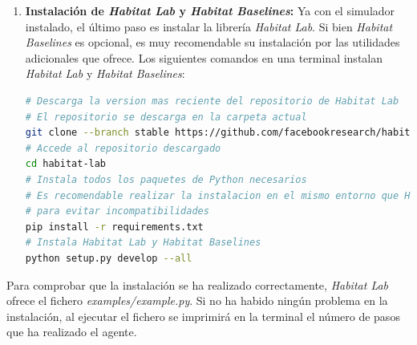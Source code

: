 \begin{enumerate}
	\item \textbf{Instalación de \textit{Habitat Lab} y \textit{Habitat Baselines}:} Ya con el simulador instalado, el último paso es instalar la librería \textit{Habitat Lab}. Si bien \textit{Habitat Baselines} es opcional, es muy recomendable su instalación por las utilidades adicionales que ofrece. Los siguientes comandos en una terminal instalan \textit{Habitat Lab} y \textit{Habitat Baselines}:
	
\begin{lstlisting}[language=bash]
# Descarga la version mas reciente del repositorio de Habitat Lab
# El repositorio se descarga en la carpeta actual
git clone --branch stable https://github.com/facebookresearch/habitat-lab.git
# Accede al repositorio descargado
cd habitat-lab
# Instala todos los paquetes de Python necesarios
# Es recomendable realizar la instalacion en el mismo entorno que Habitat Sim
# para evitar incompatibilidades
pip install -r requirements.txt
# Instala Habitat Lab y Habitat Baselines
python setup.py develop --all
\end{lstlisting}	
\end{enumerate}

Para comprobar que la instalación se ha realizado correctamente, \textit{Habitat Lab} ofrece el fichero \textit{examples/example.py}. Si no ha habido ningún problema en la instalación, al ejecutar el fichero se imprimirá en la terminal el número de pasos que ha realizado el agente.
